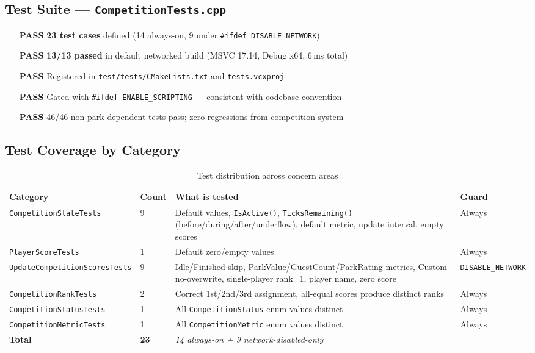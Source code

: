 \documentclass[12pt,a4paper]{article}
\begin{document}
\subsection{Test Suite --- \texttt{CompetitionTests.cpp}}

\begin{passbox}
\begin{itemize}[noitemsep]
  \item[\textcolor{passgreen}{\textbf{PASS}}] \textbf{23 test cases} defined (14 always-on, 9 under \texttt{\#ifdef DISABLE\_NETWORK})
  \item[\textcolor{passgreen}{\textbf{PASS}}] \textbf{13/13 passed} in default networked build (MSVC 17.14, Debug x64, 6\,ms total)
  \item[\textcolor{passgreen}{\textbf{PASS}}] Registered in \texttt{test/tests/CMakeLists.txt} and \texttt{tests.vcxproj}
  \item[\textcolor{passgreen}{\textbf{PASS}}] Gated with \texttt{\#ifdef ENABLE\_SCRIPTING} --- consistent with codebase convention
  \item[\textcolor{passgreen}{\textbf{PASS}}] 46/46 non-park-dependent tests pass; zero regressions from competition system
\end{itemize}
\end{passbox}

\vspace{0.5em}

\subsection{Test Coverage by Category}

\begin{table}[h!]
\centering
\begin{tabularx}{\linewidth}{llXl}
\toprule
\textbf{Category} & \textbf{Count} & \textbf{What is tested} & \textbf{Guard} \\
\midrule
\texttt{CompetitionStateTests} & 9 & Default values, \texttt{IsActive()}, \texttt{TicksRemaining()} (before/during/after/underflow), default metric, update interval, empty scores & Always \\
\texttt{PlayerScoreTests} & 1 & Default zero/empty values & Always \\
\texttt{UpdateCompetitionScoresTests} & 9 & Idle/Finished skip, ParkValue/GuestCount/ParkRating metrics, Custom no-overwrite, single-player rank=1, player name, zero score & \texttt{DISABLE\_NETWORK} \\
\texttt{CompetitionRankTests} & 2 & Correct 1st/2nd/3rd assignment, all-equal scores produce distinct ranks & Always \\
\texttt{CompetitionStatusTests} & 1 & All \texttt{CompetitionStatus} enum values distinct & Always \\
\texttt{CompetitionMetricTests} & 1 & All \texttt{CompetitionMetric} enum values distinct & Always \\
\midrule
\textbf{Total} & \textbf{23} & \textit{14 always-on + 9 network-disabled-only} & \\
\bottomrule
\end{tabularx}
\caption{Test distribution across concern areas}
\end{table}
\end{document}
